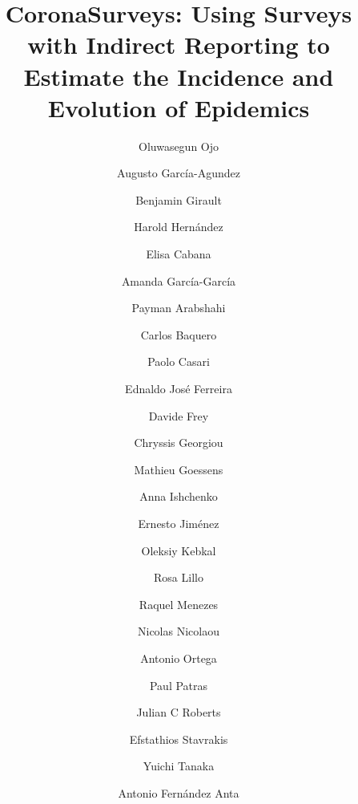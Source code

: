 \documentclass[sigconf,authordraft]{acmart}
\begin{document}
\title{CoronaSurveys: Using Surveys with Indirect Reporting to Estimate the Incidence and Evolution of Epidemics}

\author{Oluwasegun Ojo}\\
\author{Augusto García-Agundez}\\
\author{Benjamin Girault}\\
\author{Harold Hernández}\\
\author{Elisa Cabana}\\
\author{Amanda García-García}\\
\author{Payman Arabshahi}\\
\author{Carlos Baquero}\\
\author{Paolo Casari}\affiliation{}

\author{Ednaldo José Ferreira}\\
\author{Davide Frey}\\
\author{Chryssis Georgiou}\\
\author{Mathieu Goessens}\\
\author{Anna Ishchenko}\\
\author{Ernesto Jiménez}\\
\author{Oleksiy Kebkal}


\author{Rosa Lillo}\\
\author{Raquel Menezes}\\
\author{Nicolas Nicolaou}\\
\author{Antonio Ortega}\\
\author{Paul Patras}\\
\author{Julian C Roberts}\\
\author{Efstathios Stavrakis}\\
\author{Yuichi Tanaka}\\
\author{Antonio Fernández Anta}\affiliation{}

\renewcommand{\shortauthors}{Ojo et al.}
\end{document}
